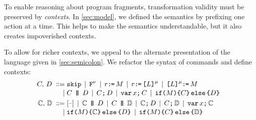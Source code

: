 To enable reasoning about program fragments, transformation validity must be
preserved by \emph{contexts}.  In \textsection\ref{sec:model}, we defined the
semantics by prefixing one action at a time.  This helps to make the
semantics understandable, but it also creates impoverished contexts.

To allow for richer contexts, we appeal to the alternate presentation of the
language given in \textsection\ref{sec:semicolon}.  We refactor the syntax
of commands and define contexts:
\begin{align*}
  \aCmd,\,\bCmd
  \BNFDEF& \SKIP
  \mkern-2mu\BNFSEP\mkern-2mu \FENCE^{\fmode}
  \mkern-2mu\BNFSEP\mkern-2mu \aReg\GETS\aExp
  \mkern-2mu\BNFSEP\mkern-2mu \aReg\GETS \REF{\cExp}^{\amode} 
  \mkern-2mu\BNFSEP\mkern-2mu \REF{\cExp}^{\amode}\GETS\aExp
  \\[-.5ex]
  \BNFSEP&\aCmd \PAR \bCmd
  \mkern-2mu\BNFSEP\mkern-2mu\aCmd \SEMI \bCmd
  \mkern-2mu\BNFSEP\mkern-2mu \VAR\aLoc\SEMI \aCmd
  \mkern-2mu\BNFSEP\mkern-2mu \IF{\aExp} \THEN \aCmd \ELSE \bCmd \FI
  \\
  \aCtxt,\,\bCtxt
  \BNFDEF& \hole{}
  \mkern-2mu\BNFSEP\mkern-2mu \aCtxt \PAR \bCmd
  \mkern-2mu\BNFSEP\mkern-2mu \aCmd \PAR \bCtxt
  \mkern-2mu\BNFSEP\mkern-2mu \aCtxt \SEMI \bCmd
  \mkern-2mu\BNFSEP\mkern-2mu \aCmd \SEMI \bCtxt
  \mkern-2mu\BNFSEP\mkern-2mu \VAR\aLoc\SEMI \aCtxt
  \\[-.5ex]
  \BNFSEP& \IF{\aExp} \THEN \aCtxt \ELSE \bCmd \FI
  \mkern-2mu\BNFSEP\mkern-2mu \IF{\aExp} \THEN \aCmd \ELSE \bCtxt \FI
\end{align*}


